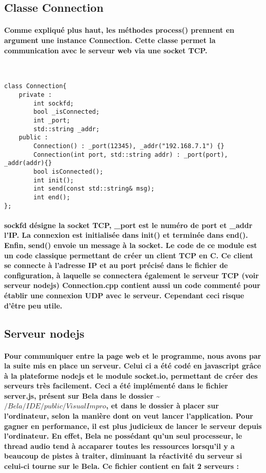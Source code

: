 \documentclass[a4paper]{article}
\begin{document}
\subsection{Classe Connection} \paragraph{Comme expliqué plus haut, les méthodes
process() prennent en argument une instance Connection. Cette classe permet la
communication avec le serveur web via une socket TCP.} \

\begin{lstlisting}
class Connection{
	private :
    	int sockfd;
        bool _isConnected;
		int _port;
        std::string _addr;
	public :
    	Connection() : _port(12345), _addr("192.168.7.1") {}
        Connection(int port, std::string addr) : _port(port), _addr(addr){}
        bool isConnected();
        int init();
        int send(const std::string& msg);
		int end();
};
\end{lstlisting}

\paragraph{sockfd désigne la socket TCP, \_port est le numéro de port et \_addr
l’IP. La connexion est initialisée dans init() et terminée dans end(). Enfin,
send() envoie un message à la socket. Le code de ce module est un code classique
permettant de créer un client TCP en C. Ce client se connecte à l’adresse IP et
au port précisé dans le fichier de configuration, à laquelle se connectera
également le serveur TCP (voir serveur nodejs) Connection.cpp contient aussi un
code commenté pour établir une connexion UDP avec le serveur. Cependant ceci
risque d’être peu utile.}

\subsection{Serveur nodejs} \paragraph{Pour communiquer entre la page web et le
programme, nous avons par la suite mis en place un serveur. Celui ci a été codé
en javascript grâce à la plateforme nodejs et le module socket.io, permettant de
créer des serveurs très facilement. Ceci a été implémenté dans le fichier
server.js, présent sur Bela dans le dossier  \textasciitilde
$/Bela/IDE/public/VisualImpro$, et dans le dossier à placer sur l’ordinateur,
selon la manière dont on veut lancer l’application. Pour gagner en performance,
il est plus judicieux de lancer le serveur depuis l’ordinateur. En effet, Bela
ne possédant qu’un seul processeur, le thread audio tend à accaparer toutes les
ressources lorsqu’il y a beaucoup de pistes à traiter, diminuant la réactivité
du serveur si celui-ci tourne sur le Bela. Ce fichier contient en fait 2
serveurs :}
\end{document}
